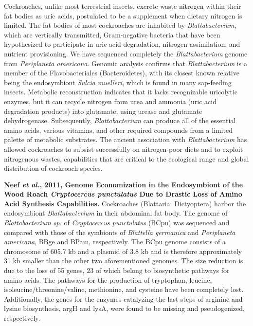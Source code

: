 \documentclass[11pt]{article}
\begin{document}
\begin{sloppypar}
Cockroaches, unlike most terrestrial insects, excrete waste nitrogen within their fat bodies as uric acids, postulated to be a supplement when dietary nitrogen is limited. 
The fat bodies of most cockroaches are inhabited by \textit{Blattabacterium}, which are vertically transmitted, Gram-negative bacteria that have been hypothesized to participate in uric acid degradation, nitrogen assimilation, and nutrient provisioning. 
We have sequenced completely the \textit{Blattabacterium} genome from \textit{Periplaneta americana}. 
Genomic analysis confirms that \textit{Blattabacterium} is a member of the Flavobacteriales (Bacteroidetes), with its closest known relative being the endosymbiont \textit{Sulcia muelleri}, which is found in many sap-feeding insects. 
Metabolic reconstruction indicates that it lacks recognizable uricolytic enzymes, but it can recycle nitrogen from urea and ammonia (uric acid degradation products) into glutamate, using urease and glutamate dehydrogenase. 
Subsequently, \textit{Blattabacterium} can produce all of the essential amino acids, various vitamins, and other required compounds from a limited palette of metabolic substrates. 
The ancient association with \textit{Blattabacterium} has allowed cockroaches to subsist successfully on nitrogen-poor diets and to exploit nitrogenous wastes, capabilities that are critical to the ecological range and global distribution of cockroach species.
\par
\textbf{Neef \textit{et al.}, 2011, Genome Economization in the Endosymbiont of the Wood Roach \textit{Cryptocercus punctulatus} Due to Drastic Loss of Amino Acid Synthesis Capabilities.} \newline
Cockroaches (Blattaria: Dictyoptera) harbor the endosymbiont \textit{Blattabacterium} in their abdominal fat body. 
The genome of \textit{Blattabacterium sp.} of \textit{Cryptocercus punctulatus} (BCpu) was sequenced and compared with those of the symbionts of \textit{Blattella germanica} and \textit{Periplaneta americana}, BBge and BPam, respectively. 
The BCpu genome consists of a chromosome of 605.7 kb and a plasmid of 3.8 kb and is therefore approximately 31 kb smaller than the other two aforementioned genomes. 
The size reduction is due to the loss of 55 genes, 23 of which belong to biosynthetic pathways for amino acids. 
The pathways for the production of tryptophan, leucine, isoleucine/threonine/valine, methionine, and cysteine have been completely lost. 
Additionally, the genes for the enzymes catalyzing the last steps of arginine and lysine biosynthesis, argH and lysA, were found to be missing and pseudogenized, respectively. 

\end{sloppypar}
\end{document}
